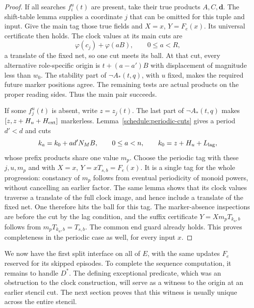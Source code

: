 \begin{proof}
If all searches $f_i^u(t)$ are present, take their true products
$A,C,\mathbf d$. The shift-table lemma supplies a coordinate $j$ that
can be omitted for this tuple and input. Give the main tag those true
fields and $X=x$, $Y=F_e(x)$. Its universal certificate then holds. The
clock values at its main cuts are
\[
 \varphi(c_j)+\varphi(aB),\qquad 0\le a<R,
\]
a translate of the fixed net, so one cut meets its ball. At that cut,
every alternative role-specific origin is $t+(a-a')B$ with displacement
of magnitude less than $w_0$. The stability part of $\neg A_*(t,q)$,
with $u$ fixed, makes the required future marker positions agree.
The remaining tests are actual products on the proper reading sides.
Thus the main pair succeeds.

If some $f_j^u(t)$ is absent, write $z=z_j(t)$. The last part of
$\neg A_*(t,q)$ makes $[z,z+H_u+H_{\rm ext}]$ markerless.
Lemma~\ref{schedule:periodic-cuts} gives a period $d'<d$ and cuts
\begin{equation}
 k_a=k_0+a d'N_MB,\qquad 0\le a<n,\qquad
 k_0=z+H_u+L_{\rm lag},
 \label{outer:periodic-progression}
\end{equation}
whose prefix products share one value $m_p$. Choose the periodic tag
with these $j,u,m_p$ and with $X=x$, $Y=xT_{s,b}=F_e(x)$.
It is a single tag for the whole progression: constancy of $m_p$ follows
from eventual periodicity of monoid powers, without cancelling an earlier
factor. The same lemma shows that its clock values traverse a translate
of the full clock image, and hence include a translate of the fixed net.
One therefore hits the ball for this tag. The marker-absence inspections
are before the cut by the lag condition, and the suffix certificate
$Y=Xm_pT_{k_a,b}$ follows from $m_pT_{k_a,b}=T_{s,b}$. The common end guard already holds. This proves
completeness in the periodic case as well, for every input $x$.
\end{proof}

We now have the first split interface on all of $E$, with the same
updates $F_e$ reserved for its skipped episodes. To complete the sequence
computation, it remains to handle $D^*$. The defining exceptional
predicate, which was an obstruction to the clock construction, will
serve as a witness to the origin at an earlier stencil cut. The next
section proves that this witness is usually unique across the entire
stencil.

